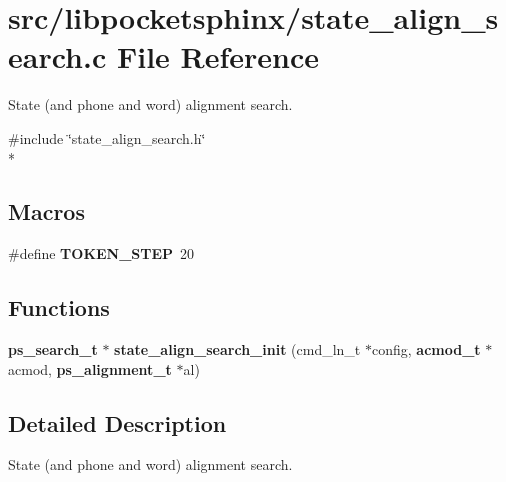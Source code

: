 \section{src/libpocketsphinx/state\+\_\+align\+\_\+search.c File Reference}
\label{state__align__search_8c}


State (and phone and word) alignment search.  


{\ttfamily \#include \char`\"{}state\+\_\+align\+\_\+search.\+h\char`\"{}}\\*
\subsection*{Macros}
\begin{DoxyCompactItemize}
\item 
\#define {\bfseries T\+O\+K\+E\+N\+\_\+\+S\+T\+E\+P}~20\label{state__align__search_8c_a197a0cf5b150b88b0e3043fd78550931}

\end{DoxyCompactItemize}
\subsection*{Functions}
\begin{DoxyCompactItemize}
\item 
{\bf ps\+\_\+search\+\_\+t} $\ast$ {\bfseries state\+\_\+align\+\_\+search\+\_\+init} (cmd\+\_\+ln\+\_\+t $\ast$config, {\bf acmod\+\_\+t} $\ast$acmod, {\bf ps\+\_\+alignment\+\_\+t} $\ast$al)\label{state__align__search_8c_a7263b71e3838f0689963439c8b695e15}

\end{DoxyCompactItemize}


\subsection{Detailed Description}
State (and phone and word) alignment search. 

